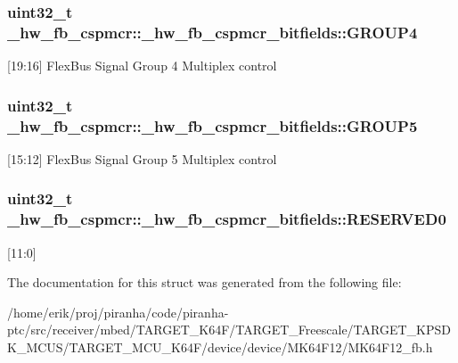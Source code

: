 \subsubsection[{\texorpdfstring{G\+R\+O\+U\+P4}{GROUP4}}]{\setlength{\rightskip}{0pt plus 5cm}uint32\+\_\+t \+\_\+hw\+\_\+fb\+\_\+cspmcr\+::\+\_\+hw\+\_\+fb\+\_\+cspmcr\+\_\+bitfields\+::\+G\+R\+O\+U\+P4}\hypertarget{struct__hw__fb__cspmcr_1_1__hw__fb__cspmcr__bitfields_a841d2799204083834bdfa62aecead8d4}{}\label{struct__hw__fb__cspmcr_1_1__hw__fb__cspmcr__bitfields_a841d2799204083834bdfa62aecead8d4}
\mbox{[}19\+:16\mbox{]} Flex\+Bus Signal Group 4 Multiplex control 
\subsubsection[{\texorpdfstring{G\+R\+O\+U\+P5}{GROUP5}}]{\setlength{\rightskip}{0pt plus 5cm}uint32\+\_\+t \+\_\+hw\+\_\+fb\+\_\+cspmcr\+::\+\_\+hw\+\_\+fb\+\_\+cspmcr\+\_\+bitfields\+::\+G\+R\+O\+U\+P5}\hypertarget{struct__hw__fb__cspmcr_1_1__hw__fb__cspmcr__bitfields_aeaa107d697fecc282cca3cb4fe42bf44}{}\label{struct__hw__fb__cspmcr_1_1__hw__fb__cspmcr__bitfields_aeaa107d697fecc282cca3cb4fe42bf44}
\mbox{[}15\+:12\mbox{]} Flex\+Bus Signal Group 5 Multiplex control 
\subsubsection[{\texorpdfstring{R\+E\+S\+E\+R\+V\+E\+D0}{RESERVED0}}]{\setlength{\rightskip}{0pt plus 5cm}uint32\+\_\+t \+\_\+hw\+\_\+fb\+\_\+cspmcr\+::\+\_\+hw\+\_\+fb\+\_\+cspmcr\+\_\+bitfields\+::\+R\+E\+S\+E\+R\+V\+E\+D0}\hypertarget{struct__hw__fb__cspmcr_1_1__hw__fb__cspmcr__bitfields_a95edd8c46ea26edb559d36c275234a6f}{}\label{struct__hw__fb__cspmcr_1_1__hw__fb__cspmcr__bitfields_a95edd8c46ea26edb559d36c275234a6f}
\mbox{[}11\+:0\mbox{]} 

The documentation for this struct was generated from the following file\+:\begin{DoxyCompactItemize}
\item 
/home/erik/proj/piranha/code/piranha-\/ptc/src/receiver/mbed/\+T\+A\+R\+G\+E\+T\+\_\+\+K64\+F/\+T\+A\+R\+G\+E\+T\+\_\+\+Freescale/\+T\+A\+R\+G\+E\+T\+\_\+\+K\+P\+S\+D\+K\+\_\+\+M\+C\+U\+S/\+T\+A\+R\+G\+E\+T\+\_\+\+M\+C\+U\+\_\+\+K64\+F/device/device/\+M\+K64\+F12/M\+K64\+F12\+\_\+fb.\+h\end{DoxyCompactItemize}
